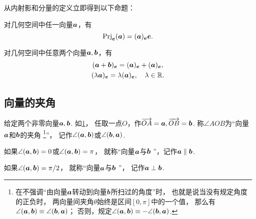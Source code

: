 从内射影和分量的定义立即得到以下命题：
\begin{theorem}
对几何空间中任一向量\(\boldsymbol{a}\)，有\[
	\operatorname{Prj}_{\boldsymbol{e}}(\boldsymbol{a})
	= (\boldsymbol{a})_{\boldsymbol{e}} \boldsymbol{e}.
\]
\end{theorem}

\begin{theorem}
对几何空间中任意两个向量\(\boldsymbol{a},\boldsymbol{b}\)，有\begin{gather}
	(\boldsymbol{a}+\boldsymbol{b})_{\boldsymbol{e}}
	= (\boldsymbol{a})_{\boldsymbol{e}}
	+ (\boldsymbol{a})_{\boldsymbol{e}}, \\
	(\lambda \boldsymbol{a})_{\boldsymbol{e}}
	= \lambda (\boldsymbol{a})_{\boldsymbol{e}},
	\quad\lambda\in\mathbb{R}.
\end{gather}
\end{theorem}

\subsection{向量的夹角}

\begin{definition}
给定两个非零向量\(\boldsymbol{a},\boldsymbol{b}\).
如\cref{figure:解析几何.向量的夹角}，
任取一点\(O\)，作\(\overrightarrow{OA}=\boldsymbol{a},\overrightarrow{OB}=\boldsymbol{b}\).
称\(\angle{AOB}\)为“向量\(\boldsymbol{a}\)和\(\boldsymbol{b}\)的夹角%
\footnote{%
在不强调“由向量\(\boldsymbol{a}\)转动到向量\(\boldsymbol{b}\)所扫过的角度”时，
也就是说当没有规定角度的正负时，
两向量间夹角\(\theta\)始终是区间\([0,\pi]\)中的一个值，
那么有\(\angle(\boldsymbol{a},\boldsymbol{b}) \equiv \angle(\boldsymbol{b},\boldsymbol{a})\)；%
否则，规定\(\angle(\boldsymbol{a},\boldsymbol{b}) \equiv -\angle(\boldsymbol{b},\boldsymbol{a})\).%
}”，
记作\(\angle(\boldsymbol{a},\boldsymbol{b})\)或\(\angle(\boldsymbol{b},\boldsymbol{a})\).

\begin{figure}[ht]
\centering
{}
\caption{}
\label{figure:解析几何.向量的夹角}
\end{figure}

如果\(\angle(\boldsymbol{a},\boldsymbol{b}) = 0\)或\(\angle(\boldsymbol{a},\boldsymbol{b}) = \pi\)，
就称“向量\(\boldsymbol{a}\)与\(\boldsymbol{b}\) ”，记作\(\boldsymbol{a}\parallel\boldsymbol{b}\).

如果\(\angle(\boldsymbol{a},\boldsymbol{b}) = \pi/2\)，
就称“向量\(\boldsymbol{a}\)与\(\boldsymbol{b}\) ”，
记作\(\boldsymbol{a}\perp\boldsymbol{b}\).
\end{definition}


